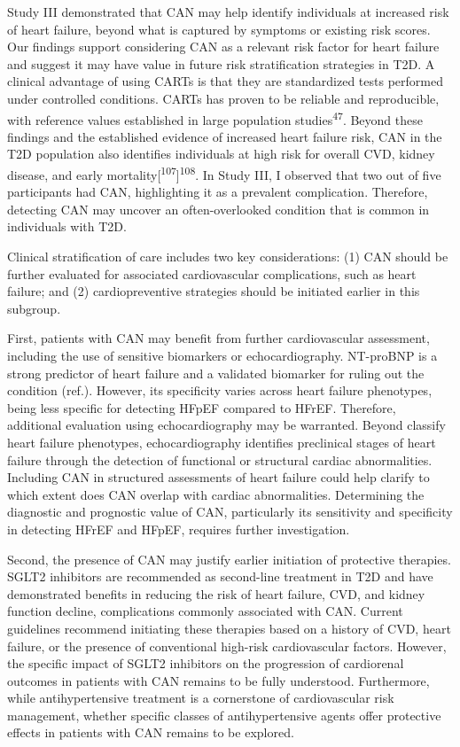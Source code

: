 \documentclass[
  a4paper,
  headsepline=true,
  open=any]{scrbook}
\begin{document}
Study III demonstrated that CAN may help identify individuals at
increased risk of heart failure, beyond what is captured by symptoms or
existing risk scores. Our findings support considering CAN as a relevant
risk factor for heart failure and suggest it may have value in future
risk stratification strategies in T2D. A clinical advantage of using
CARTs is that they are standardized tests performed under controlled
conditions. CARTs has proven to be reliable and reproducible, with
reference values established in large population
studies\textsuperscript{47}. Beyond these findings and the established
evidence of increased heart failure risk, CAN in the T2D population also
identifies individuals at high risk for overall CVD, kidney disease, and
early mortality{[}\textsuperscript{107}{]}\textsuperscript{108}. In
Study III, I observed that two out of five participants had CAN,
highlighting it as a prevalent complication. Therefore, detecting CAN
may uncover an often-overlooked condition that is common in individuals
with T2D.

Clinical stratification of care includes two key considerations: (1) CAN
should be further evaluated for associated cardiovascular complications,
such as heart failure; and (2) cardiopreventive strategies should be
initiated earlier in this subgroup.

First, patients with CAN may benefit from further cardiovascular
assessment, including the use of sensitive biomarkers or
echocardiography. NT-proBNP is a strong predictor of heart failure and a
validated biomarker for ruling out the condition (ref.). However, its
specificity varies across heart failure phenotypes, being less specific
for detecting HFpEF compared to HFrEF. Therefore, additional evaluation
using echocardiography may be warranted. Beyond classify heart failure
phenotypes, echocardiography identifies preclinical stages of heart
failure through the detection of functional or structural cardiac
abnormalities. Including CAN in structured assessments of heart failure
could help clarify to which extent does CAN overlap with cardiac
abnormalities. Determining the diagnostic and prognostic value of CAN,
particularly its sensitivity and specificity in detecting HFrEF and
HFpEF, requires further investigation.

Second, the presence of CAN may justify earlier initiation of protective
therapies. SGLT2 inhibitors are recommended as second-line treatment in
T2D and have demonstrated benefits in reducing the risk of heart
failure, CVD, and kidney function decline, complications commonly
associated with CAN. Current guidelines recommend initiating these
therapies based on a history of CVD, heart failure, or the presence of
conventional high-risk cardiovascular factors. However, the specific
impact of SGLT2 inhibitors on the progression of cardiorenal outcomes in
patients with CAN remains to be fully understood. Furthermore, while
antihypertensive treatment is a cornerstone of cardiovascular risk
management, whether specific classes of antihypertensive agents offer
protective effects in patients with CAN remains to be explored.
\end{document}
